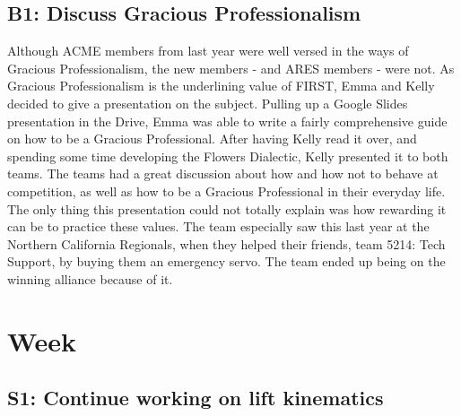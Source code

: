 \documentclass{article}
\begin{document}
\subsection{B1: Discuss Gracious Professionalism}

Although ACME members from last year were well versed in the ways of Gracious Professionalism, the new members - and ARES members - were not. As Gracious Professionalism is the underlining value of FIRST, Emma and Kelly decided to give a presentation on the subject. Pulling up a Google Slides presentation in the Drive, Emma was able to write a fairly comprehensive guide on how to be a Gracious Professional. After having Kelly read it over, and spending some time developing the Flowers Dialectic, Kelly presented it to both teams. The teams had a great discussion about how and how not to behave at competition, as well as how to be a Gracious Professional in their everyday life. The only thing this presentation could not totally explain was how rewarding it can be to practice these values. The team especially saw this last year at the Northern California Regionals, when they helped their friends, team 5214: Tech Support, by buying them an emergency servo. The team ended up being on the winning alliance because of it.  
\clearpage \newpage \section{Week \thesection} 
\subsection{S1: Continue working on lift kinematics}
\end{document}
